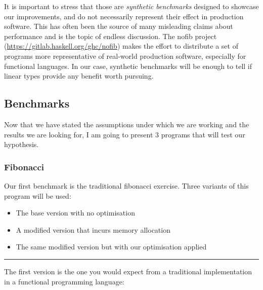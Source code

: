 \documentclass[
]{article}
\providecommand{\tightlist}{%
  \setlength{\itemsep}{0pt}\setlength{\parskip}{0pt}}
\begin{document}
It is important to stress that those are \emph{synthetic benchmarks}
designed to showcase our improvements, and do not necessarily represent
their effect in production software. This has often been the source of
many misleading claims about performance and is the topic of endless
discussion. The nofib\cite{nofib} project
(\url{https://gitlab.haskell.org/ghc/nofib}) makes the effort to
distribute a set of programs more representative of real-world
production software, especially for functional languages. In our case,
synthetic benchmarks will be enough to tell if linear types provide any
benefit worth pursuing.

\hypertarget{benchmarks}{%
\subsection{Benchmarks}\label{benchmarks}}

Now that we have stated the assumptions under which we are working and
the results we are looking for, I am going to present 3 programs that
will test our hypothesis.

\hypertarget{fibonacci}{%
\subsubsection{Fibonacci}\label{fibonacci}}

Our first benchmark is the traditional fibonacci exercise. Three
variants of this program will be used:

\begin{itemize}
\tightlist
\item
  The base version with no optimisation
\item
  A modified version that incurs memory allocation
\item
  The same modified version but with our optimisation applied
\end{itemize}

\begin{center}\rule{0.5\linewidth}{0.5pt}\end{center}

The first version is the one you would expect from a traditional
implementation in a functional programming language:
\end{document}
